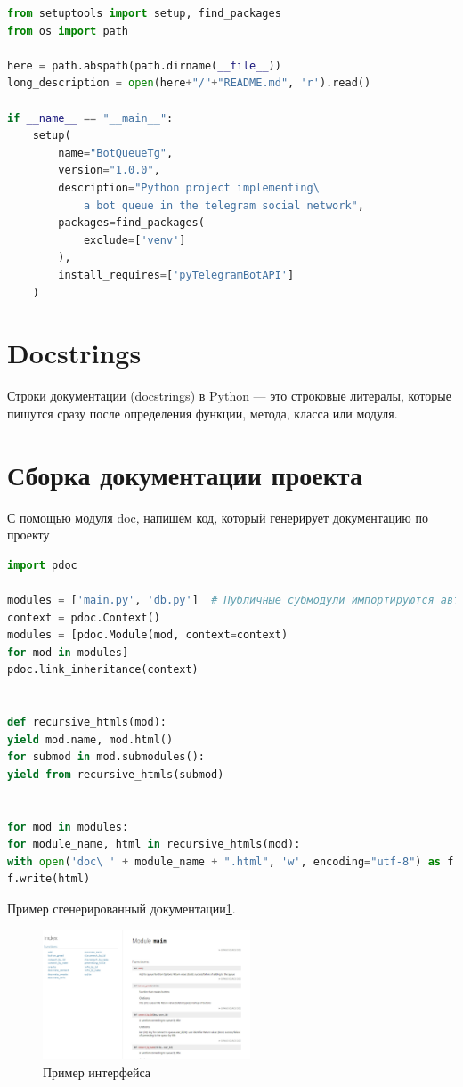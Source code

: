 \begin{lstlisting}[language=Python
	, caption=\leftline{Текст файла setup.py}
	, label=lst:setup]
from setuptools import setup, find_packages
from os import path

here = path.abspath(path.dirname(__file__))
long_description = open(here+"/"+"README.md", 'r').read()

if __name__ == "__main__":
	setup(
		name="BotQueueTg",
		version="1.0.0",
		description="Python project implementing\
			a bot queue in the telegram social network",
		packages=find_packages(
			exclude=['venv']
		),
		install_requires=['pyTelegramBotAPI']
	)
\end{lstlisting}

\section{Docstrings}
Строки документации (docstrings) в Python --- это строковые литералы,
которые пишутся сразу после определения функции, метода, класса или модуля.

\section{Сборка документации проекта}
С помощью модуля doc, напишем код, который генерирует документацию по проекту

\begin{lstlisting}[language=Python
, caption=\leftline{doc.py}
, label=lst:doc]
import pdoc

modules = ['main.py', 'db.py']  # Публичные субмодули импортируются автоматически
context = pdoc.Context()
modules = [pdoc.Module(mod, context=context)
for mod in modules]
pdoc.link_inheritance(context)


def recursive_htmls(mod):
yield mod.name, mod.html()
for submod in mod.submodules():
yield from recursive_htmls(submod)


for mod in modules:
for module_name, html in recursive_htmls(mod):
with open('doc\ ' + module_name + ".html", 'w', encoding="utf-8") as f:
f.write(html)

\end{lstlisting}

Пример сгенерированный документации\ref{fig:doc}.
\begin{figure}[h!tp]
\centering
\includegraphics[width=0.55\textwidth]{doc}
\caption{Пример интерфейса}
\label{fig:doc}
\end{figure}
